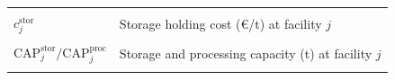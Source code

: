 \documentclass[APA,TimesLARGE]{WileyNJDv5} %
\begin{document}
\begin{table}[!h]
\begin{tabular}[t]{>{\raggedright\arraybackslash}p{5cm}>{\raggedright\arraybackslash}p{9cm}}
\hspace{1em}\cellcolor{gray!10}{$c^{\text{tr-pre}}$} & \cellcolor{gray!10}{Transport cost rate (€/t\,km) for pre-treated biomass}\\
\hspace{1em}$c^{\text{stor}}_j$ & Storage holding cost (€/t) at facility $j$\\
\hspace{1em}\cellcolor{gray!10}{$d_{ij}$, $d_{jk}$} & \cellcolor{gray!10}{Distance (km) between nodes}\\
\hspace{1em}$\text{CAP}^{\text{stor}}_j/\text{CAP}^{\text{proc}}_j$ & Storage and processing capacity (t) at facility $j$\\
\hspace{1em}\cellcolor{gray!10}{$D^{\max}_{kpt}$} & \cellcolor{gray!10}{Maximum demand (t) of fraction $p$ at consumer $k$ in period $t$}\\
\bottomrule
\end{tabular}
\end{table}
\end{document}
